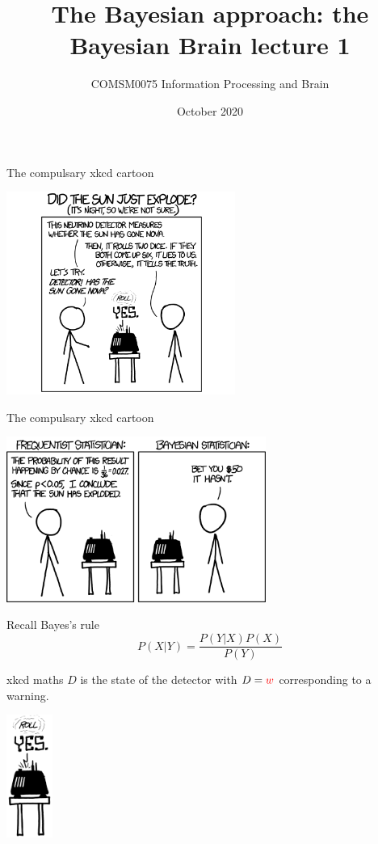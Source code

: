 \documentclass{beamer}
\title[The Bayesian Brain lecture 1]{The Bayesian approach: the Bayesian Brain lecture 1}
\author{COMSM0075 Information Processing and Brain}
\institute{\texttt{comsm0075.github.io}}
\date{October 2020}
\newcommand{\crish}{\color{reddish}}
\newcommand{\cbla}{\color{black}}
\newcommand{\cred}{\color{red}}
\begin{document}
\maketitle

\begin{frame}{The compulsary xkcd cartoon}
\begin{center}
\includegraphics[width=7.5cm]{xkcd1.png}
\end{center}
\vfill
{}
\end{frame}


\begin{frame}{The compulsary xkcd cartoon}
\begin{center}
\includegraphics[width=8.5cm]{xkcd2.png}
\end{center}
\vfill
{}
\end{frame}

\begin{frame}{Recall Bayes's rule}
  \crish$$
  P(X|Y)=\frac{P(Y|X)P(X)}{P(Y)}
  $$\cbla
\end{frame}

\begin{frame}{xkcd maths}
  \crish$D$\cbla{} is the state of the detector with
  \crish$D=\cred{}w$\cbla{} corresponding to a \cred{}warning\cbla{}.
\begin{center}
\includegraphics[width=1.5cm]{xkcd_detector.png}
\end{center}
\end{frame}
\end{document}
